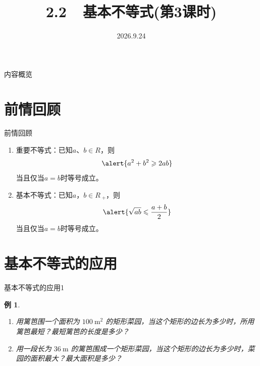 \documentclass[aspectratio=169,13pt,fleqn] {beamer}
\title[2.2基本不等式]{2.2~~基本不等式(第3课时)}
\author[好好学习，努力向上]{}
\institute{}
\date{2026.9.24}
\newtheorem{instance}{例}   %
\begin{document}
\begin{frame}{}
	\titlepage
\end{frame}

\begin{frame}{内容概览}
	\tableofcontents
\end{frame}

\section{前情回顾}
\begin{frame}{前情回顾}
	
	\begin{enumerate}[(1)]
		\item 重要不等式：已知$a$、$b\in R$，则
		\[
		\alert{a^2 + b^2 \geqslant 2ab}
		\]
		当且仅当$a=b$时等号成立。
		\item 基本不等式：已知$a$，$b\in R_{\;+}$，则
		\[
		\alert{\sqrt{ab} \leqslant \frac{a+b}{2}}
		\]
		当且仅当$a=b$时等号成立。
	\end{enumerate}
	
\end{frame}

\section{基本不等式的应用}
\begin{frame}[t]{基本不等式的应用1}
	\begin{instance}
		\begin{enumerate}[(\arabic*)]
			\item<1-|alert@1> 用篱笆围一个面积为 $100\ \mathrm{m^2}$ 的矩形菜园，当这个矩形的边长为多少时，所用篱笆最短？最短篱笆的长度是多少？
			\item<2-|alert@2> 用一段长为 $36\ \mathrm{m}$ 的篱笆围成一个矩形菜园，当这个矩形的边长为多少时，菜园的面积最大？最大面积是多少？
		\end{enumerate}
	\end{instance}
	
	
\end{frame}
\end{document}
